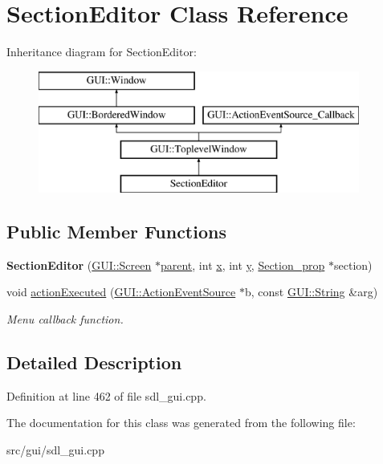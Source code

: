 \hypertarget{classSectionEditor}{\section{Section\-Editor Class Reference}
\label{classSectionEditor}
}
Inheritance diagram for Section\-Editor\-:\begin{figure}[H]
\begin{center}
\leavevmode
\includegraphics[height=4.000000cm]{classSectionEditor}
\end{center}
\end{figure}
\subsection*{Public Member Functions}
\begin{DoxyCompactItemize}
\item 
\hypertarget{classSectionEditor_a5b4b01aaafcd5cb87b20e5aa7cab7f87}{{\bfseries Section\-Editor} (\hyperlink{classGUI_1_1Screen}{G\-U\-I\-::\-Screen} $\ast$\hyperlink{classGUI_1_1Window_a2e593ff65e7702178d82fe9010a0b539}{parent}, int \hyperlink{classGUI_1_1Window_a6ca6a80ca00c9e1d8ceea8d3d99a657d}{x}, int \hyperlink{classGUI_1_1Window_a0ee8e923aff2c3661fc2e17656d37adf}{y}, \hyperlink{classSection__prop}{Section\-\_\-prop} $\ast$section)}\label{classSectionEditor_a5b4b01aaafcd5cb87b20e5aa7cab7f87}

\item 
\hypertarget{classSectionEditor_affef3df8632e3d7cef272a5cbcd4728f}{void \hyperlink{classSectionEditor_affef3df8632e3d7cef272a5cbcd4728f}{action\-Executed} (\hyperlink{classGUI_1_1ActionEventSource}{G\-U\-I\-::\-Action\-Event\-Source} $\ast$b, const \hyperlink{classGUI_1_1String}{G\-U\-I\-::\-String} \&arg)}\label{classSectionEditor_affef3df8632e3d7cef272a5cbcd4728f}

\begin{DoxyCompactList}\small\item\em Menu callback function. \end{DoxyCompactList}\end{DoxyCompactItemize}


\subsection{Detailed Description}


Definition at line 462 of file sdl\-\_\-gui.\-cpp.



The documentation for this class was generated from the following file\-:\begin{DoxyCompactItemize}
\item 
src/gui/sdl\-\_\-gui.\-cpp\end{DoxyCompactItemize}
